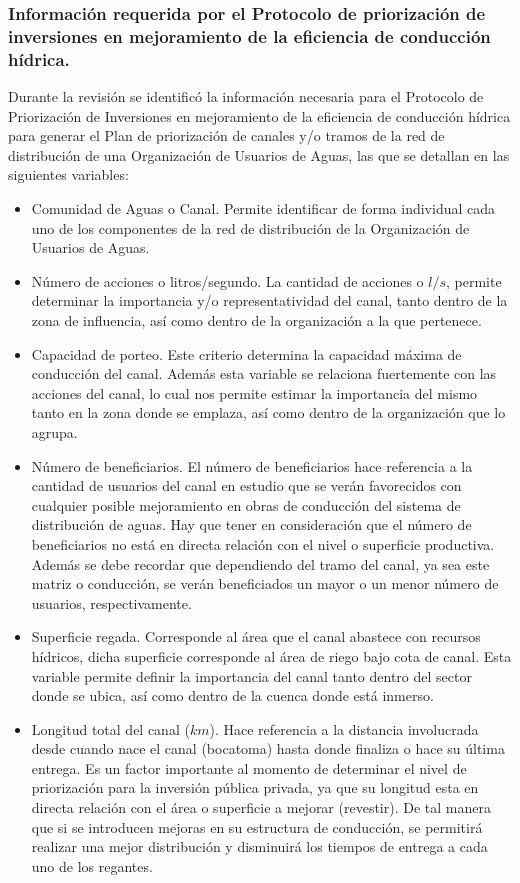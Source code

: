 \documentclass[]{article}
\begin{document}
\subsubsection{Información requerida por el Protocolo de priorización de inversiones en mejoramiento de la eficiencia de conducción hídrica.}

Durante la revisión se identificó la información necesaria para el Protocolo de Priorización de Inversiones en mejoramiento de la eficiencia de conducción hídrica para generar el Plan de priorización de canales y/o tramos de la red de distribución de una Organización de Usuarios de Aguas, las que se detallan en las siguientes variables:

\begin{itemize}
\item Comunidad de Aguas o Canal. Permite identificar de forma individual cada uno de los componentes de la red de distribución de la Organización de Usuarios de Aguas.
\item Número de acciones o litros/segundo. La cantidad de acciones o $l/s$, permite determinar la importancia y/o representatividad del canal, tanto dentro de la zona de influencia, así como dentro de la organización a la que pertenece.
\item Capacidad de porteo. Este criterio determina la capacidad máxima de conducción del canal. Además esta variable se relaciona fuertemente con las acciones del canal, lo cual nos permite estimar la importancia del mismo tanto en la zona donde se emplaza, así como dentro de la organización que lo agrupa.
\item Número de beneficiarios. El número de beneficiarios hace referencia a la cantidad de usuarios del canal en estudio que se verán favorecidos con cualquier posible mejoramiento en obras de conducción del sistema de distribución de aguas. Hay que tener en consideración que el número de beneficiarios no está en directa relación con el nivel o superficie productiva. Además se debe recordar que dependiendo del tramo del canal, ya sea este matriz o conducción, se verán beneficiados un mayor o un menor número de usuarios, respectivamente.
\item Superficie regada. Corresponde al área que el canal abastece con recursos hídricos, dicha superficie corresponde al área de riego bajo cota de canal. Esta variable permite definir la importancia del canal tanto dentro del sector donde se ubica, así como dentro de la cuenca donde está inmerso.
\item Longitud total del canal ($km$). Hace referencia a la distancia involucrada desde cuando nace el canal (bocatoma) hasta donde finaliza o hace su última entrega. Es un factor importante al momento de determinar el nivel de priorización para la inversión pública privada, ya que su longitud esta en directa relación con el área o superficie a mejorar (revestir). De tal manera que si se introducen mejoras en su estructura de conducción, se permitirá realizar una mejor distribución y disminuirá los tiempos de entrega a cada uno de los regantes.

\end{itemize}
\end{document}
